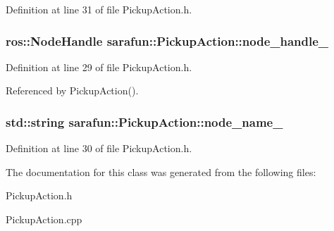 Definition at line 31 of file Pickup\-Action.\-h.

\hypertarget{classsarafun_1_1PickupAction_a7e7ccf1fed497576aebe7bb3c6cb57b3_a7e7ccf1fed497576aebe7bb3c6cb57b3}{
\subsubsection[{node\-\_\-handle\-\_\-}]{\setlength{\rightskip}{0pt plus 5cm}ros\-::\-Node\-Handle sarafun\-::\-Pickup\-Action\-::node\-\_\-handle\-\_\-\hspace{0.3cm}{\ttfamily [private]}}}\label{classsarafun_1_1PickupAction_a7e7ccf1fed497576aebe7bb3c6cb57b3_a7e7ccf1fed497576aebe7bb3c6cb57b3}


Definition at line 29 of file Pickup\-Action.\-h.



Referenced by Pickup\-Action().

\hypertarget{classsarafun_1_1PickupAction_a07fa3609628d2c5ac95a6cce904aa1b2_a07fa3609628d2c5ac95a6cce904aa1b2}{
\subsubsection[{node\-\_\-name\-\_\-}]{\setlength{\rightskip}{0pt plus 5cm}std\-::string sarafun\-::\-Pickup\-Action\-::node\-\_\-name\-\_\-\hspace{0.3cm}{\ttfamily [private]}}}\label{classsarafun_1_1PickupAction_a07fa3609628d2c5ac95a6cce904aa1b2_a07fa3609628d2c5ac95a6cce904aa1b2}


Definition at line 30 of file Pickup\-Action.\-h.



The documentation for this class was generated from the following files\-:\begin{DoxyCompactItemize}
\item 
Pickup\-Action.\-h\item 
Pickup\-Action.\-cpp\end{DoxyCompactItemize}
